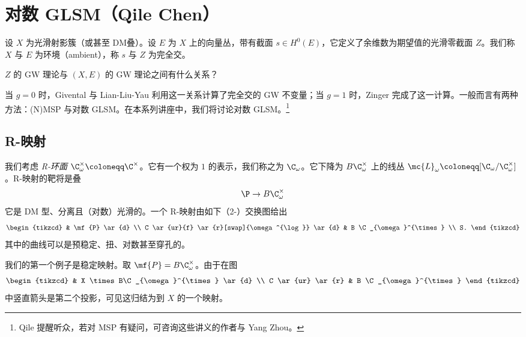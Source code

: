 \section{对数 GLSM（Qile Chen）}%
\label{sec:Log GLSM (Qile Chen)}

设 \(X\) 为光滑射影簇（或甚至 DM叠）。设 \(E\) 为 \(X\) 上的向量丛，带有截面 \(s \in H^0(E)\)，它定义了余维数为期望值的光滑零截面 \(Z\)。我们称 \(X\) 与 \(E\) 为环境（ambient），称 \(s\) 与 \(Z\) 为完全交。

\begin{quest}
    \(Z\) 的 GW 理论与 \((X, E)\) 的 GW 理论之间有什么关系？
\end{quest}

当 \(g = 0\) 时，Givental 与 Lian-Liu-Yau 利用这一关系计算了完全交的 GW 不变量；当 \(g = 1\) 时，Zinger 完成了这一计算。一般而言有两种方法：(N)MSP 与对数 GLSM。在本系列讲座中，我们将讨论对数 GLSM。\footnote{Qile 提醒听众，若对 MSP 有疑问，可咨询这些讲义的作者与 Yang Zhou。}

\subsection{R-映射}%
\label{sub:R-maps}

我们考虑 \textit{R-环面} \(\C^{\times}_{\omega} \coloneqq \C^{\times}\)。它有一个权为 \(1\) 的表示，我们称之为 \(\C_{\omega}\)。它下降为 \(B \C_{\omega}^{\times}\) 上的线丛 \(\mc{L}_{\omega} \coloneqq [\C_{\omega} / \C^{\times}_{\omega}]\)。R-映射的靶将是叠
\[ \P \to B \C^{\times}_{\omega} \]
它是 DM 型、分离且（对数）光滑的。一个 R-映射由如下（2-）交换图给出
\begin{equation*}
\begin{tikzcd}
    & \mf{P} \ar{d} \\
    C \ar{ur}{f} \ar{r}[swap]{\omega^{\log}} \ar{d} & B \C_{\omega}^{\times} \\
    S.
\end{tikzcd}
\end{equation*}
其中的曲线可以是预稳定、扭、对数甚至穿孔的。

\begin{exm}
    我们的第一个例子是稳定映射。取 \(\mf{P} = B\C_{\omega}^{\times}\)。由于在图
    \begin{equation*}
    \begin{tikzcd}
        & X \times B\C_{\omega}^{\times} \ar{d} \\
        C \ar{ur} \ar{r} & B \C_{\omega}^{\times}
    \end{tikzcd}
    \end{equation*}
    中竖直箭头是第二个投影，可见这归结为到 \(X\) 的一个映射。
\end{exm}

